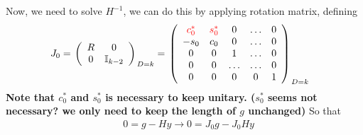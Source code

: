 Now, we need to solve $H^{-1}$, we can do this by applying rotation matrix, defining
\begin{equation}
\begin{split}
&J_0=
{\left.\left(\begin{array}{cc}
 R & 0 \\
0 & \mathbb{I}_{k-2} \\
\end{array}\right)\right. }_{D=k}
={\left.\left(\begin{array}{ccccc}
\textcolor[rgb]{1,0,0}{c_0^*} & \textcolor[rgb]{1,0,0}{s_0^*} & 0 & \ldots & 0 \\
-s_0 & c_0 & 0 & \ldots & 0 \\
0 & 0 & 1 & \ldots & 0 \\
0 & 0 & \ldots & \ldots & 0 \\
0 & 0 & 0 & 0 & 1 \\
\end{array}\right)\right. }_{D=k}
\end{split}
\end{equation}
\textbf{Note that $c_0^*$ and $s_0^*$ is necessary to keep unitary. ($s_0^*$ seems not necessary? we only need to keep the length of $g$ unchanged)} So that
\begin{equation}
\begin{split}
&0=g-Hy\to 0=J_0g-J_0Hy\\
\end{split}
\end{equation}

